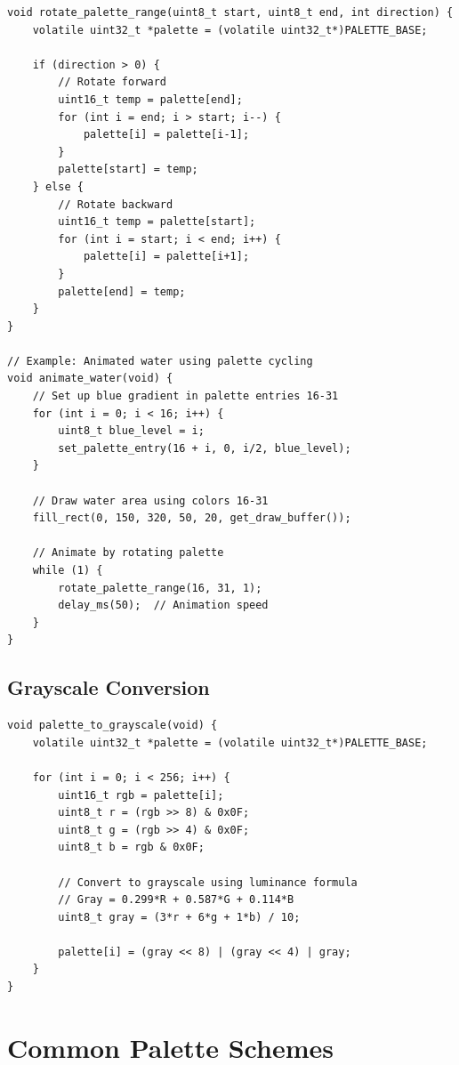 \documentclass[11pt,letterpaper]{report}
\begin{document}
\begin{lstlisting}[style=c,caption={Water Effect Using Palette Rotation}]
void rotate_palette_range(uint8_t start, uint8_t end, int direction) {
    volatile uint32_t *palette = (volatile uint32_t*)PALETTE_BASE;
    
    if (direction > 0) {
        // Rotate forward
        uint16_t temp = palette[end];
        for (int i = end; i > start; i--) {
            palette[i] = palette[i-1];
        }
        palette[start] = temp;
    } else {
        // Rotate backward
        uint16_t temp = palette[start];
        for (int i = start; i < end; i++) {
            palette[i] = palette[i+1];
        }
        palette[end] = temp;
    }
}

// Example: Animated water using palette cycling
void animate_water(void) {
    // Set up blue gradient in palette entries 16-31
    for (int i = 0; i < 16; i++) {
        uint8_t blue_level = i;
        set_palette_entry(16 + i, 0, i/2, blue_level);
    }
    
    // Draw water area using colors 16-31
    fill_rect(0, 150, 320, 50, 20, get_draw_buffer());
    
    // Animate by rotating palette
    while (1) {
        rotate_palette_range(16, 31, 1);
        delay_ms(50);  // Animation speed
    }
}
\end{lstlisting}

\subsection{Grayscale Conversion}

\begin{lstlisting}[style=c,caption={Convert Palette to Grayscale}]
void palette_to_grayscale(void) {
    volatile uint32_t *palette = (volatile uint32_t*)PALETTE_BASE;
    
    for (int i = 0; i < 256; i++) {
        uint16_t rgb = palette[i];
        uint8_t r = (rgb >> 8) & 0x0F;
        uint8_t g = (rgb >> 4) & 0x0F;
        uint8_t b = rgb & 0x0F;
        
        // Convert to grayscale using luminance formula
        // Gray = 0.299*R + 0.587*G + 0.114*B
        uint8_t gray = (3*r + 6*g + 1*b) / 10;
        
        palette[i] = (gray << 8) | (gray << 4) | gray;
    }
}
\end{lstlisting}

\section{Common Palette Schemes}
\end{document}
